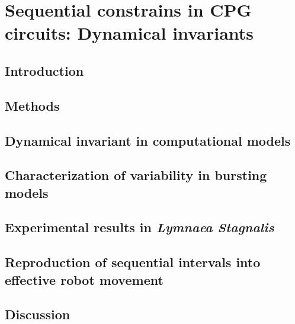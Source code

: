 \chapter{Sequential constrains in CPG circuits: Dynamical invariants}
\label{c-invariants}
\section{Introduction}
\section{Methods}
\section{Dynamical invariant in computational models}

\section{Characterization of variability in bursting models}
\label{c-invariants-model}
\section{Experimental results in \textit{Lymnaea Stagnalis}}

\section{Reproduction of sequential intervals into effective robot movement}

\section{Discussion}